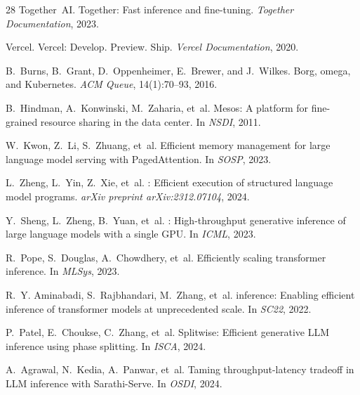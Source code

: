 \begin{thebibliography}{28}
Together~AI.
\newblock Together: Fast inference and fine-tuning.
\newblock \emph{Together Documentation}, 2023.

Vercel.
\newblock Vercel: Develop. Preview. Ship.
\newblock \emph{Vercel Documentation}, 2020.

B.~Burns, B.~Grant, D.~Oppenheimer, E.~Brewer, and J.~Wilkes.
\newblock Borg, omega, and {Kubernetes}.
\newblock \emph{ACM Queue}, 14(1):70--93, 2016.

B.~Hindman, A.~Konwinski, M.~Zaharia, et~al.
\newblock Mesos: A platform for fine-grained resource sharing in the data center.
\newblock In \emph{NSDI}, 2011.

W.~Kwon, Z.~Li, S.~Zhuang, et~al.
\newblock Efficient memory management for large language model serving with {PagedAttention}.
\newblock In \emph{SOSP}, 2023.

L.~Zheng, L.~Yin, Z.~Xie, et~al.
: Efficient execution of structured language model programs.
\newblock \emph{arXiv preprint arXiv:2312.07104}, 2024.

Y.~Sheng, L.~Zheng, B.~Yuan, et~al.
: High-throughput generative inference of large language models with a single {GPU}.
\newblock In \emph{ICML}, 2023.

R.~Pope, S.~Douglas, A.~Chowdhery, et~al.
\newblock Efficiently scaling transformer inference.
\newblock In \emph{MLSys}, 2023.

R.~Y. Aminabadi, S.~Rajbhandari, M.~Zhang, et~al.
 inference: Enabling efficient inference of transformer models at unprecedented scale.
\newblock In \emph{SC22}, 2022.

P.~Patel, E.~Choukse, C.~Zhang, et~al.
\newblock Splitwise: Efficient generative {LLM} inference using phase splitting.
\newblock In \emph{ISCA}, 2024.

A.~Agrawal, N.~Kedia, A.~Panwar, et~al.
\newblock Taming throughput-latency tradeoff in {LLM} inference with {Sarathi-Serve}.
\newblock In \emph{OSDI}, 2024.

\end{thebibliography}

